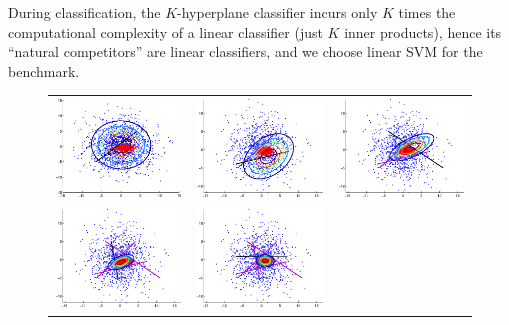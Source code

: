 \documentclass[twoside,11pt]{article}
\begin{document}
During classification, the $K$-hyperplane classifier incurs
only $K$ times the computational complexity of
a linear classifier (just $K$ inner products), hence its ``natural
competitors'' are linear classifiers, and we choose linear SVM for the benchmark.
\begin{figure}
\center
\begin{tabular}{ccc}
 \includegraphics[width=2in]{ex_5_1.eps}
&\includegraphics[width=2in]{ex_5_2.eps}
& \includegraphics[width=2in]{ex_5_3.eps} \\
  \includegraphics[width=2in]{ex_5_4.eps}
& \includegraphics[width=2in]{ex_5_5.eps}

\end{tabular}
\end{figure}
\end{document}
